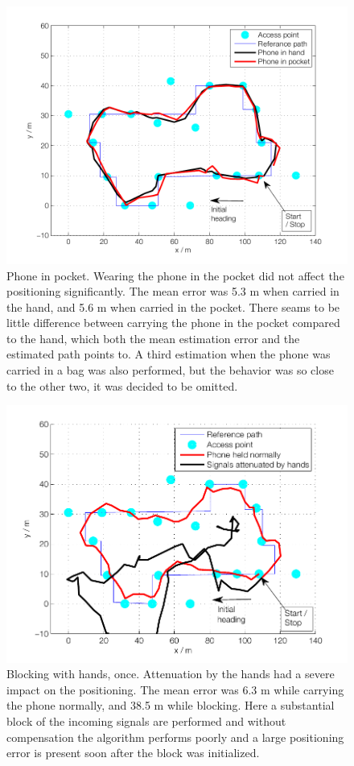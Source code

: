 \documentclass{LTHthesis}
\begin{document}
\begin{figure}

\includegraphics[width=1\textwidth ]{images/adapt_parameters/positioning_pocket}
\caption{Phone in pocket. Wearing the phone in the pocket did not affect the positioning significantly. The mean error was 5.3 m when carried in the hand, and 5.6 m when carried in the pocket. There seams to be little difference between carrying the phone in the pocket compared to the hand, which both the mean estimation error and the estimated path points to. A third estimation when the phone was carried in a bag was also performed, but the behavior was so close to the other two, it was decided to be omitted.}\label{positioning_pocket}
\end{figure}

\begin{figure}

\includegraphics[width=1\textwidth ]{images/adapt_parameters/hand_block}
\caption{Blocking with hands, once. Attenuation by the hands had a severe impact on the positioning. The mean error was 6.3 m while carrying the phone normally, and 38.5 m while blocking. Here a substantial block of the incoming signals are performed and without compensation the algorithm performs poorly and a large positioning error is present soon after the block was initialized. }\label{hand_block}
\end{figure}
\end{document}
